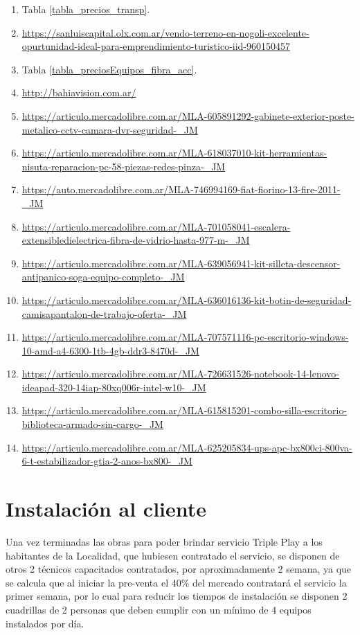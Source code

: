 \documentclass[12pt,a4paper]{book}
\begin{document}
\begin{enumerate}
\item \label{cost_inv_13} Tabla \ref{tabla_precios_transp}.
\item \label{cost_inv_1}
\url{https://sanluiscapital.olx.com.ar/vendo-terreno-en-nogoli-excelente-opurtunidad-ideal-para-emprendimiento-turistico-iid-960150457}
\item \label{cost_inv_14} Tabla \ref{tabla_preciosEquipos_fibra_acc}.
\item \label{cost_inv_2}
\url{http://bahiavision.com.ar/}
\item \label{cost_inv_3}
\url{https://articulo.mercadolibre.com.ar/MLA-605891292-gabinete-exterior-poste-metalico-cctv-camara-dvr-seguridad-_JM}
\item \label{cost_inv_4}
\url{https://articulo.mercadolibre.com.ar/MLA-618037010-kit-herramientas-nisuta-reparacion-pc-58-piezas-redes-pinza-_JM}
\item \label{cost_inv_5}
\url{https://auto.mercadolibre.com.ar/MLA-746994169-fiat-fiorino-13-fire-2011-_JM}
\item \label{cost_inv_6}
\url{https://articulo.mercadolibre.com.ar/MLA-701058041-escalera-extensibledielectrica-fibra-de-vidrio-hasta-977-m-_JM}
\item \label{cost_inv_7}
\url{https://articulo.mercadolibre.com.ar/MLA-639056941-kit-silleta-descensor-antipanico-soga-equipo-completo-_JM}
\item \label{cost_inv_8}
\url{https://articulo.mercadolibre.com.ar/MLA-636016136-kit-botin-de-seguridad-camisapantalon-de-trabajo-oferta-_JM}
\item \label{cost_inv_9}
\url{https://articulo.mercadolibre.com.ar/MLA-707571116-pc-escritorio-windows-10-amd-a4-6300-1tb-4gb-ddr3-8470d-_JM}
\item \label{cost_inv_10}
\url{https://articulo.mercadolibre.com.ar/MLA-726631526-notebook-14-lenovo-ideapad-320-14iap-80xq006r-intel-w10-_JM}
\item \label{cost_inv_11}
\url{https://articulo.mercadolibre.com.ar/MLA-615815201-combo-silla-escritorio-biblioteca-armado-sin-cargo-_JM}
\item \label{cost_inv_12}
\url{https://articulo.mercadolibre.com.ar/MLA-625205834-ups-apc-bx800ci-800va-6-t-estabilizador-gtia-2-anos-bx800-_JM}
\end{enumerate}



\section{Instalación al cliente}\label{sec_inst_inicial_plan_accion}
Una vez terminadas las obras para poder brindar servicio Triple Play a los habitantes de la Localidad, que hubiesen contratado el servicio, se disponen de otros 2 técnicos capacitados contratados, por aproximadamente 2 semana, ya que se calcula que al iniciar la pre-venta el 40\% del mercado contratará el servicio la primer semana, por lo cual para reducir los tiempos de instalación se disponen 2 cuadrillas de 2 personas que deben cumplir con un mínimo de 4 equipos instalados por día.
\end{document}
